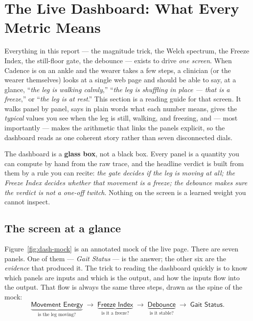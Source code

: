 \section{The Live Dashboard: What Every Metric Means}
\label{sec:dashboard}

Everything in this report --- the magnitude trick, the Welch spectrum, the Freeze
Index, the still-floor gate, the debounce --- exists to drive \emph{one screen}. When
Cadence is on an ankle and the wearer takes a few steps, a clinician (or the wearer
themselves) looks at a single web page and should be able to say, at a glance,
``\emph{the leg is walking calmly},'' ``\emph{the leg is shuffling in place --- that is a
freeze},'' or ``\emph{the leg is at rest}.'' This section is a reading guide for that
screen. It walks panel by panel, says in plain words what each number means, gives the
\emph{typical} values you see when the leg is still, walking, and freezing, and --- most
importantly --- makes the arithmetic that links the panels explicit, so the dashboard
reads as one coherent story rather than seven disconnected dials.

\begin{keyidea}
The dashboard is a \textbf{glass box}, not a black box. Every panel is a quantity you
can compute by hand from the raw trace, and the headline verdict is built from them by a
rule you can recite: \emph{the gate decides if the leg is moving at all; the Freeze
Index decides whether that movement is a freeze; the debounce makes sure the verdict is
not a one-off twitch}. Nothing on the screen is a learned weight you cannot inspect.
\end{keyidea}

\subsection{The screen at a glance}

Figure~\ref{fig:dash-mock} is an annotated mock of the live page. There are seven
panels. One of them --- \emph{Gait Status} --- is the answer; the other six are the
\emph{evidence} that produced it. The trick to reading the dashboard quickly is to know
which panels are inputs and which is the output, and how the inputs flow into the
output. That flow is always the same three steps, drawn as the spine of the mock:
\[
\underbrace{\textsf{Movement Energy}}_{\text{is the leg moving?}}
\;\longrightarrow\;
\underbrace{\textsf{Freeze Index}}_{\text{is it a freeze?}}
\;\longrightarrow\;
\underbrace{\textsf{Debounce}}_{\text{is it stable?}}
\;\longrightarrow\;
\textsf{Gait Status}.
\]

